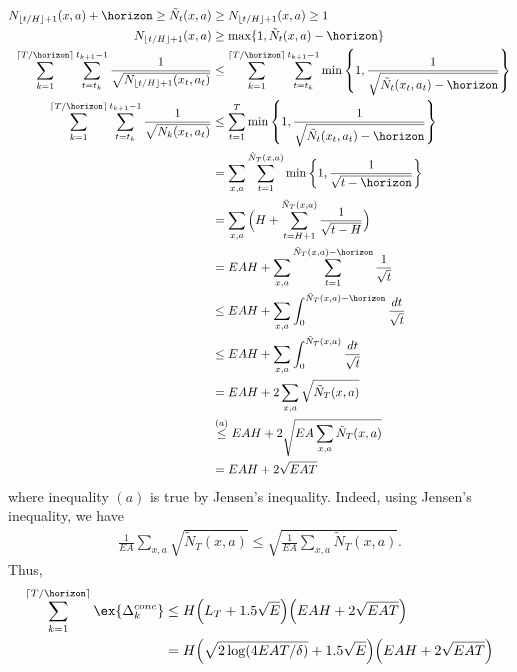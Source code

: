             \begin{align*}
                N_{\lfloor t/H\rfloor+1}(x,a) +\horizon \ge \tilde{N}_t(x,a) &\ge N_{\lfloor t/H\rfloor+1}(x,a) \ge 1 \\
                N_{\lfloor t/H\rfloor+1}(x,a) &\ge \max\{1, \tilde{N}_t(x,a) -\horizon\} \\
                \sum_{k=1}^{\lceil T/\horizon\rceil} \sum_{t=t_k}^{t_{k+1}-1} \frac{1}{\sqrt{N_{\lfloor t/H\rfloor+1}(x_t,a_t)}} &\le \sum_{k=1}^{\lceil T/\horizon\rceil} \sum_{t=t_k}^{t_{k+1}-1} \min\left\{1, \frac{1}{\sqrt{\tilde{N}_t(x_t,a_t) -\horizon}}\right\} \\
                \sum_{k=1}^{\lceil T/\horizon\rceil} \sum_{t=t_k}^{t_{k+1}-1} \frac{1}{\sqrt{N_k(x_t,a_t)}} &\le \sum_{t=1}^{T} \min\left\{1, \frac{1}{\sqrt{\tilde{N}_t(x_t,a_t) -\horizon}}\right\} \\
                &= \sum_{x,a} \sum_{t=1}^{\tilde{N}_T(x,a)} \min\left\{1, \frac{1}{\sqrt{t -\horizon}}\right\} \\
                &= \sum_{x,a} \Big(H +\sum_{t=H+1}^{\tilde{N}_T(x,a)} \frac{1}{\sqrt{t -H}}\Big) \\
                &= EAH +\sum_{x,a} \sum_{t=1}^{\tilde{N}_T(x,a) -\horizon} \frac{1}{\sqrt{t}} \\
                &\le EAH +\sum_{x,a} \int_0^{\tilde{N}_T(x,a) -\horizon} \frac{dt}{\sqrt{t}} \\
                &\le EAH +\sum_{x,a} \int_0^{\tilde{N}_T(x,a)} \frac{dt}{\sqrt{t}} \\
                &= EAH +2\sum_{x,a} \sqrt{\tilde{N}_T(x,a)} \\
                &\overset{(a)}\le EAH +2\sqrt{EA \sum_{x,a}\tilde{N}_T(x,a)} \\
                &= EAH +2\sqrt{EAT}
            \end{align*}
            where inequality $(a)$ is true by Jensen's inequality. Indeed, using Jensen's inequality, we have
            \begin{align*}
                \frac{1}{EA}\sum_{x,a}\sqrt{\tilde{N}_T(x,a)} \le\sqrt{\frac{1}{EA}\sum_{x,a}\tilde{N}_T(x,a)}.
            \end{align*}
            Thus,
            \begin{align*}
                \sum_{k=1}^{\lceil T/\horizon\rceil}\ex{\Delta_k^{conc}}
                &\le H\Big(L_T+1.5\sqrt{E}\Big) \Big(EAH +2\sqrt{EAT}\Big) \\
                &= H\Big(\sqrt{2\log(4EAT/\delta)} +1.5\sqrt{E}\Big) \Big(EAH +2\sqrt{EAT}\Big)
            \end{align*}
